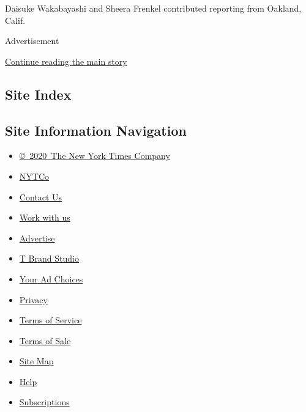 Daisuke Wakabayashi and Sheera Frenkel contributed reporting from
Oakland, Calif.

Advertisement

\protect\hyperlink{after-bottom}{Continue reading the main story}

\hypertarget{site-index}{%
\subsection{Site Index}\label{site-index}}

\hypertarget{site-information-navigation}{%
\subsection{Site Information
Navigation}\label{site-information-navigation}}

\begin{itemize}
\tightlist
\item
  \href{https://help.nytimes.com/hc/en-us/articles/115014792127-Copyright-notice}{©~2020~The
  New York Times Company}
\end{itemize}

\begin{itemize}
\tightlist
\item
  \href{https://www.nytco.com/}{NYTCo}
\item
  \href{https://help.nytimes.com/hc/en-us/articles/115015385887-Contact-Us}{Contact
  Us}
\item
  \href{https://www.nytco.com/careers/}{Work with us}
\item
  \href{https://nytmediakit.com/}{Advertise}
\item
  \href{http://www.tbrandstudio.com/}{T Brand Studio}
\item
  \href{https://www.nytimes.com/privacy/cookie-policy\#how-do-i-manage-trackers}{Your
  Ad Choices}
\item
  \href{https://www.nytimes.com/privacy}{Privacy}
\item
  \href{https://help.nytimes.com/hc/en-us/articles/115014893428-Terms-of-service}{Terms
  of Service}
\item
  \href{https://help.nytimes.com/hc/en-us/articles/115014893968-Terms-of-sale}{Terms
  of Sale}
\item
  \href{https://spiderbites.nytimes.com}{Site Map}
\item
  \href{https://help.nytimes.com/hc/en-us}{Help}
\item
  \href{https://www.nytimes.com/subscription?campaignId=37WXW}{Subscriptions}
\end{itemize}
